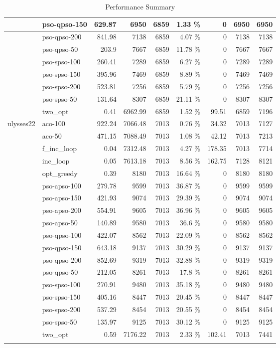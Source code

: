 \documentclass[conference]{IEEEtran}
\begin{document}
\begin{center}
\begin{longtable}[ht]{|l|l|r|r|r|r|r|r|r|}
 & pso-qpso-150 & 629.87 & 6950 & 6859 & 1.33 \% & 0 & 6950 & 6950 \\ \hline
 & pso-qpso-200 & 841.98 & 7138 & 6859 & 4.07 \% & 0 & 7138 & 7138 \\ \hline
 & pso-qpso-50 & 203.9 & 7667 & 6859 & 11.78 \% & 0 & 7667 & 7667 \\ \hline
 & pso-spso-100 & 260.41 & 7289 & 6859 & 6.27 \% & 0 & 7289 & 7289 \\ \hline
 & pso-spso-150 & 395.96 & 7469 & 6859 & 8.89 \% & 0 & 7469 & 7469 \\ \hline
 & pso-spso-200 & 523.81 & 7256 & 6859 & 5.79 \% & 0 & 7256 & 7256 \\ \hline
 & pso-spso-50 & 131.64 & 8307 & 6859 & 21.11 \% & 0 & 8307 & 8307 \\ \hline
 & two\_opt & 0.41 & 6962.99 & 6859 & 1.52 \% & 99.51 & 6859 & 7196 \\ \hline
ulysses22 & aco-100 & 922.24 & 7066.48 & 7013 & 0.76 \% & 34.32 & 7013 & 7127 \\ \hline
 & aco-50 & 471.15 & 7088.49 & 7013 & 1.08 \% & 42.12 & 7013 & 7213 \\ \hline
 & f\_inc\_loop & 0.04 & 7312.48 & 7013 & 4.27 \% & 178.35 & 7013 & 7714 \\ \hline
 & inc\_loop & 0.05 & 7613.18 & 7013 & 8.56 \% & 162.75 & 7128 & 8121 \\ \hline
 & opt\_greedy & 0.39 & 8180 & 7013 & 16.64 \% & 0 & 8180 & 8180 \\ \hline
 & pso-apso-100 & 279.78 & 9599 & 7013 & 36.87 \% & 0 & 9599 & 9599 \\ \hline
 & pso-apso-150 & 421.93 & 9074 & 7013 & 29.39 \% & 0 & 9074 & 9074 \\ \hline
 & pso-apso-200 & 554.91 & 9605 & 7013 & 36.96 \% & 0 & 9605 & 9605 \\ \hline
 & pso-apso-50 & 140.89 & 9580 & 7013 & 36.6 \% & 0 & 9580 & 9580 \\ \hline
 & pso-qpso-100 & 422.07 & 8562 & 7013 & 22.09 \% & 0 & 8562 & 8562 \\ \hline
 & pso-qpso-150 & 643.18 & 9137 & 7013 & 30.29 \% & 0 & 9137 & 9137 \\ \hline
 & pso-qpso-200 & 852.69 & 9319 & 7013 & 32.88 \% & 0 & 9319 & 9319 \\ \hline
 & pso-qpso-50 & 212.05 & 8261 & 7013 & 17.8 \% & 0 & 8261 & 8261 \\ \hline
 & pso-spso-100 & 270.91 & 9480 & 7013 & 35.18 \% & 0 & 9480 & 9480 \\ \hline
 & pso-spso-150 & 405.16 & 8447 & 7013 & 20.45 \% & 0 & 8447 & 8447 \\ \hline
 & pso-spso-200 & 537.29 & 8454 & 7013 & 20.55 \% & 0 & 8454 & 8454 \\ \hline
 & pso-spso-50 & 135.97 & 9125 & 7013 & 30.12 \% & 0 & 9125 & 9125 \\ \hline
 & two\_opt & 0.59 & 7176.22 & 7013 & 2.33 \% & 102.41 & 7013 & 7441 \\ \hline
        \caption{Performance Summary} \label{tab:performancesummary} \\	
        \end{longtable}
    \end{center}
\clearpage
\end{document}
